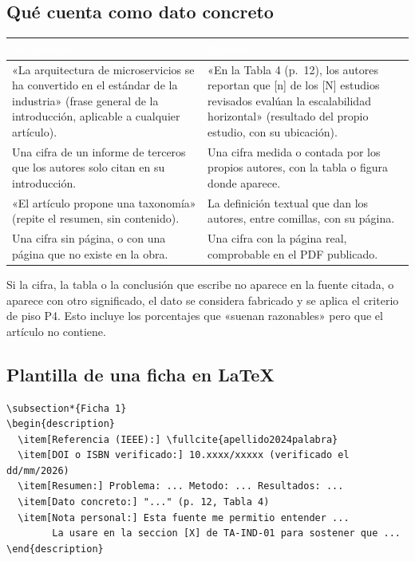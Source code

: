 \documentclass[11pt,a4paper]{article}
\newcommand{\hdr}[1]{\textcolor{white}{\textbf{#1}}}
\begin{document}
\subsection{Qué cuenta como dato concreto}

\begin{xltabular}{\linewidth}{@{}YY@{}}
	\toprule
	\hdr{No cumple} & \hdr{Cumple} \\
	\midrule
	\endhead
	«La arquitectura de microservicios se ha convertido en el estándar de la industria» (frase general de la introducción, aplicable a cualquier artículo). & «En la Tabla 4 (p.~12), los autores reportan que [n] de los [N] estudios revisados evalúan la escalabilidad horizontal» (resultado del propio estudio, con su ubicación). \\
	\addlinespace
	Una cifra de un informe de terceros que los autores solo citan en su introducción. & Una cifra medida o contada por los propios autores, con la tabla o figura donde aparece. \\
	\addlinespace
	«El artículo propone una taxonomía» (repite el resumen, sin contenido). & La definición textual que dan los autores, entre comillas, con su página. \\
	\addlinespace
	Una cifra sin página, o con una página que no existe en la obra. & Una cifra con la página real, comprobable en el PDF publicado. \\
	\bottomrule
\end{xltabular}

\begin{avisoBox}[title={Un dato que no está en la fuente es un dato fabricado}]
	Si la cifra, la tabla o la conclusión que escribe no aparece en la fuente citada, o aparece con otro significado, el dato se considera fabricado y se aplica el criterio de piso P4. Esto incluye los porcentajes que «suenan razonables» pero que el artículo no contiene.
\end{avisoBox}

\subsection{Plantilla de una ficha en \LaTeX}

\begin{lstlisting}
\subsection*{Ficha 1}
\begin{description}
  \item[Referencia (IEEE):] \fullcite{apellido2024palabra}
  \item[DOI o ISBN verificado:] 10.xxxx/xxxxx (verificado el dd/mm/2026)
  \item[Resumen:] Problema: ... Metodo: ... Resultados: ...
  \item[Dato concreto:] "..." (p. 12, Tabla 4)
  \item[Nota personal:] Esta fuente me permitio entender ...
        La usare en la seccion [X] de TA-IND-01 para sostener que ...
\end{description}
\end{lstlisting}
\end{document}
